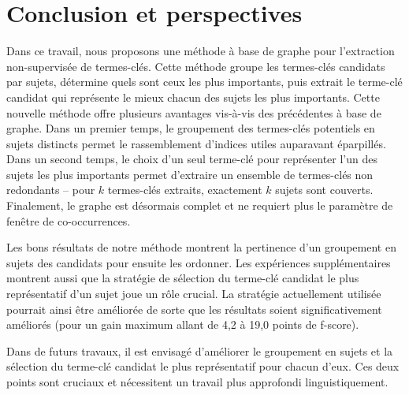 \section{Conclusion et perspectives}
\label{sec:conclusion_et_perspectives}
  Dans ce travail, nous proposons une méthode à base de graphe pour
  l'extraction non-supervisée de termes-clés. Cette méthode groupe les
  termes-clés candidats par sujets, détermine quels sont ceux les plus
  importants, puis extrait le terme-clé candidat qui représente le mieux chacun
  des sujets les plus importants. Cette nouvelle méthode offre plusieurs
  avantages vis-à-vis des précédentes à base de graphe. Dans un premier temps,
  le groupement des termes-clés potentiels en sujets distincts permet le
  rassemblement d'indices utiles auparavant éparpillés. Dans un second temps,
  le choix d'un seul terme-clé pour représenter l'un des sujets les plus
  importants permet d'extraire un ensemble de termes-clés non redondants -- pour
  $k$ termes-clés extraits, exactement $k$ sujets sont couverts. Finalement, le
  graphe est désormais complet et ne requiert plus le paramètre de fenêtre de
  co-occurrences.

  Les bons résultats de notre méthode montrent la pertinence d'un groupement en
  sujets des candidats pour ensuite les ordonner. Les expériences
  supplémentaires montrent aussi que la stratégie de sélection du terme-clé
  candidat le plus représentatif d'un sujet joue un rôle crucial. La stratégie
  actuellement utilisée pourrait ainsi être améliorée de sorte que les résultats
  soient significativement améliorés (pour un gain maximum allant de 4,2 à 19,0
  points de f-score).

  Dans de futurs travaux, il est envisagé d'améliorer le groupement en sujets et
  la sélection du terme-clé candidat le plus représentatif pour chacun d'eux.
  Ces deux points sont cruciaux et nécessitent un travail plus approfondi
  linguistiquement. 
  
